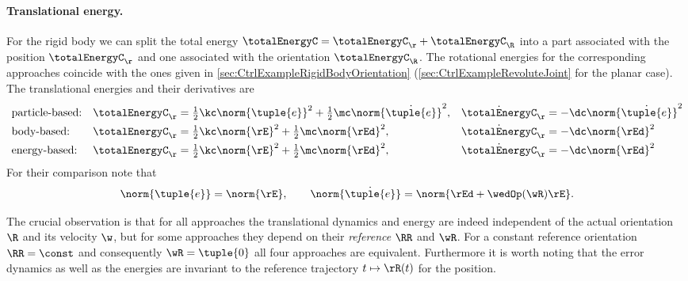 \paragraph{Translational energy.}
For the rigid body we can split the total energy $\totalEnergyC = \totalEnergyC_{\r} + \totalEnergyC_{\R}$ into a part associated with the position $\totalEnergyC_{\r}$ and one associated with the orientation $\totalEnergyC_{\R}$.
The rotational energies for the corresponding approaches coincide with the ones given in \autoref{sec:CtrlExampleRigidBodyOrientation} (\autoref{sec:CtrlExampleRevoluteJoint} for the planar case).
The translational energies and their derivatives are
\begin{subequations}
\begin{align}
 &\text{particle-based:}&
 \totalEnergyC_{\r} &= \tfrac{1}{2} \kc \norm{\tuple{e}}^2 + \tfrac{1}{2} \mc \norm{\dot{\tuple{e}}}^2,&
 \dot{\totalEnergyC}_{\r} &= -\dc\norm{\dot{\tuple{e}}}^2
\\
 &\text{body-based:}&
 \totalEnergyC_{\r} &= \tfrac{1}{2} \kc \norm{\rE}^2 + \tfrac{1}{2} \mc \norm{\rEd}^2,&
 \dot{\totalEnergyC}_{\r} &= -\dc\norm{\rEd}^2 
\\
 &\text{energy-based:}&
 \totalEnergyC_{\r} &= \tfrac{1}{2} \kc \norm{\rE}^2 + \tfrac{1}{2} \mc \norm{\rEd}^2,&
 \dot{\totalEnergyC}_{\r} &= -\dc\norm{\rEd}^2 
\end{align}
\end{subequations}
For their comparison note that
\begin{align}
 \norm{\tuple{e}} = \norm{\rE},
\qquad
 \norm{\dot{\tuple{e}}} = \norm{\rEd + \wedOp(\wR) \rE}.
\end{align}

The crucial observation is that for all approaches the translational dynamics and energy are indeed independent of the actual orientation $\R$ and its velocity $\w$, but for some approaches they depend on their \textit{reference} $\RR$ and $\wR$.
For a constant reference orientation $\RR = \const$ and consequently $\wR = \tuple{0}$ all four approaches are equivalent.
Furthermore it is worth noting that the error dynamics as well as the energies are invariant to the reference trajectory $t\mapsto\rR(t)$ for the position.

